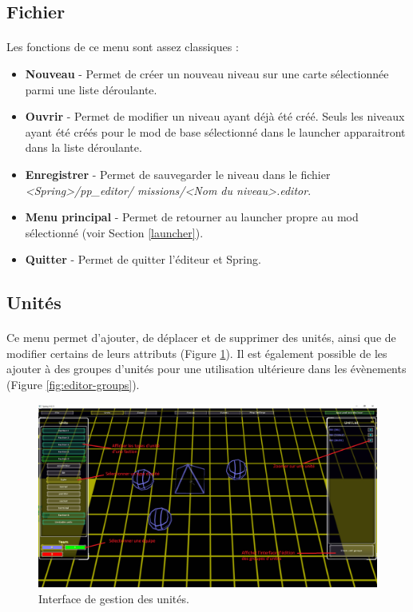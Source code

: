 \documentclass[a4paper]{article}
\begin{document}
\subsection{Fichier}
\paragraph{ }
Les fonctions de ce menu sont assez classiques :
\begin{itemize}
\item \textbf{Nouveau} - Permet de créer un nouveau niveau sur une carte sélectionnée parmi une liste déroulante.
\item \textbf{Ouvrir} - Permet de modifier un niveau ayant déjà été créé. Seuls les niveaux ayant été créés pour le mod de base sélectionné dans le launcher apparaitront dans la liste déroulante.
\item \textbf{Enregistrer} - Permet de sauvegarder le niveau dans le fichier \textit{<Spring>/pp\_editor/ missions/<Nom du niveau>.editor}.
\item \textbf{Menu principal} - Permet de retourner au launcher propre au mod sélectionné (voir Section \ref{launcher}).
\item \textbf{Quitter} - Permet de quitter l'éditeur et Spring.
\end{itemize}
\subsection{Unités}
\paragraph{ }
Ce menu permet d'ajouter, de déplacer et de supprimer des unités, ainsi que de modifier certains de leurs attributs (Figure \ref{fig:editor-units}). Il est également possible de les ajouter à des groupes d'unités pour une utilisation ultérieure dans les évènements (Figure \ref{fig:editor-groups}).
\begin{figure}[H]
\centering
\includegraphics[width=\linewidth]{editor-units.png}
\caption{Interface de gestion des unités.}
\label{fig:editor-units}
\end{figure}
\end{document}

